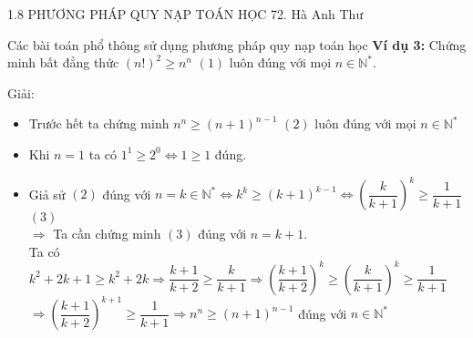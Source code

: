 \begin{frame}{1.8 PHƯƠNG PHÁP QUY NẠP TOÁN HỌC \hspace{2cm}  72. Hà Anh Thư} 
\begin{block}{Các bài toán phổ thông sử dụng phương pháp quy nạp toán học}
\textbf{Ví dụ 3:} Chứng minh bất đẳng thức $(n!)^2 \ge n^n$ $(1)$ luôn đúng với mọi $n \in \mathbb{N}^*$. \\
\pause
\begin{center}
    Giải:
\end{center}
\begin{itemize}
    \item Trước hết ta chứng minh $n^n \ge (n + 1)^{n - 1}$ $(2)$ luôn đúng với mọi $n \in \mathbb{N}^*$ \\
    \pause
    \item Khi $n = 1$ ta có $1^1 \ge 2^0 \Leftrightarrow 1 \ge 1$ đúng. \\
    \pause
    \item Giả sử $(2)$ đúng với $n = k \in \mathbb{N}^* \Leftrightarrow k^k \ge (k + 1)^{k - 1} \Leftrightarrow \left(\dfrac{k}{k + 1}\right)^k \ge \dfrac{1}{k + 1}$ $(3)$ \\
        \pause
        $\Rightarrow$ Ta cần chứng minh $(3)$ đúng với $n = k + 1$. \\
        \pause
        Ta có $k^2 + 2k + 1 \ge k^2 + 2k \Rightarrow \dfrac{k + 1}{k + 2} \ge \dfrac{k}{k + 1} \Rightarrow \left(\dfrac{k + 1}{k + 2}\right)^k \ge \left(\dfrac{k}{k + 1}\right)^k \ge \dfrac{1}{k + 1}$ \\
        $\Rightarrow \left(\dfrac{k + 1}{k + 2}\right)^{k + 1} \ge \dfrac{1}{k + 1} \Rightarrow n^n \ge (n + 1)^{n - 1}$ đúng với $n \in \mathbb{N}^*$
\end{itemize}
\end{block}

\end{frame}

